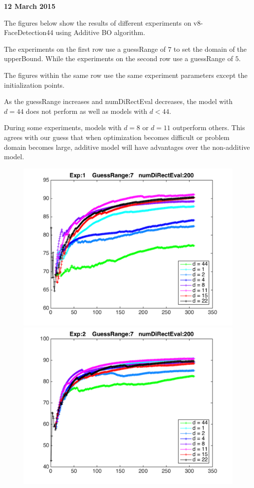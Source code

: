\documentclass{article}
\begin{document}
{\bf \large 12 March 2015}

The figures below show the results of different experiments on 
v8-FaceDetection44 using Additive BO algorithm.

The experiments on the first row use a guessRange of $7$ to set the
domain of the upperBound.
While the experiments on the second row use a guessRange of $5$.

The figures within the same row use the same experiment parameters except
the initialization points. 

As the guessRange increases and numDiRectEval decreases, 
the model with $d=44$ does not perform as well as models with $d <
44$.

During some experiments, models with $d=8$ or $d=11$ outperform
others.
This agrees with our guess that when optimization becomes difficult
or problem domain becomes large, additive model will have advantages
over the non-additive model.


\begin{figure}[!htbp]
\begin{minipage}{0.45\textwidth}
\includegraphics[width = \textwidth]{alpha-1.png}
\end{minipage}
\begin{minipage}{0.45\textwidth}
\includegraphics[width = \textwidth]{alpha-2.png}
\end{minipage}
\end{figure}
\end{document}
